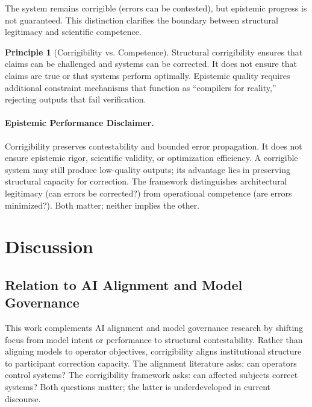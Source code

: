 \documentclass[11pt,a4paper]{article}
\theoremstyle{definition}
\newtheorem{principle}{Principle}[section]
\begin{document}
The system remains corrigible (errors can be contested), but epistemic progress is not guaranteed. This distinction clarifies the boundary between structural legitimacy and scientific competence.

\begin{principle}[Corrigibility vs. Competence]
Structural corrigibility ensures that claims can be challenged and systems can be corrected. It does not ensure that claims are true or that systems perform optimally. Epistemic quality requires additional constraint mechanisms that function as ``compilers for reality,'' rejecting outputs that fail verification.
\end{principle}

\paragraph{Epistemic Performance Disclaimer.} Corrigibility preserves contestability and bounded error propagation. It does not ensure epistemic rigor, scientific validity, or optimization efficiency. A corrigible system may still produce low-quality outputs; its advantage lies in preserving structural capacity for correction. The framework distinguishes architectural legitimacy (can errors be corrected?) from operational competence (are errors minimized?). Both matter; neither implies the other.


\section{Discussion}
\label{sec:discussion}

\subsection{Relation to AI Alignment and Model Governance}

This work complements AI alignment and model governance research by shifting focus from model intent or performance to structural contestability. Rather than aligning models to operator objectives, corrigibility aligns institutional structure to participant correction capacity. The alignment literature asks: can operators control systems? The corrigibility framework asks: can affected subjects correct systems? Both questions matter; the latter is underdeveloped in current discourse.
\end{document}

